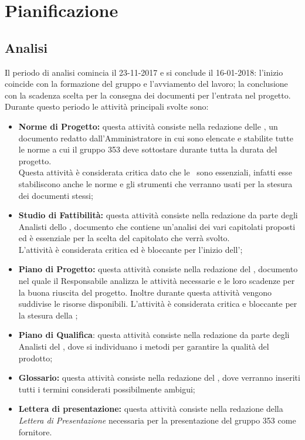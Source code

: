 \documentclass[PianoDiProgetto.tex]{subfiles}
\begin{document}
\chapter{Pianificazione}

\section{Analisi}
Il periodo di analisi comincia il 23-11-2017 e si conclude il 16-01-2018: l'inizio coincide con la formazione del gruppo e l'avviamento del lavoro; la conclusione con la scadenza scelta per la consegna dei documenti per l'entrata nel progetto. Durante questo periodo le attività principali svolte sono:
\begin{itemize}
	\item \textbf{Norme di Progetto:} questa attività consiste nella redazione delle \normediprogetto, un documento redatto dall'Amministratore in cui sono elencate e stabilite tutte le norme a cui il gruppo 353 deve sottostare durante tutta la durata del progetto.\\ 
	Questa attività è considerata critica dato che le \normediprogetto\ sono essenziali, infatti esse stabiliscono anche le norme e gli strumenti che verranno usati per la stesura dei documenti stessi;
	\item \textbf{Studio di Fattibilità:} questa attività consiste nella redazione da parte degli Analisti dello \studiodifattibilita, documento che contiene un'analisi dei vari capitolati proposti ed è essenziale per la scelta del capitolato che verrà svolto. \\
	L'attività è considerata critica ed è bloccante per l'inizio dell'\analisideirequisiti;
	\item \textbf{Piano di Progetto:} questa attività consiste nella redazione del \pianodiprogetto, documento nel quale il Responsabile analizza le attività necessarie e le loro scadenze per la buona riuscita del progetto. Inoltre durante questa attività vengono suddivise le risorse disponibili. L'attività è considerata critica e bloccante per la stesura della ;
	\item \textbf{Piano di Qualifica}: questa attività consiste nella redazione da parte degli Analisti del \pianodiqualifica, dove si individuano i metodi per garantire la qualità del prodotto;
	\item \textbf{Glossario:} questa attività consiste nella redazione del \glossario, dove verranno inseriti tutti i termini considerati possibilmente ambigui;
	\item \textbf{Lettera di presentazione:} questa attività consiste nella redazione della \textit{Lettera di Presentazione} necessaria per la presentazione del gruppo 353 come fornitore. 	
\end{itemize}	
\end{document}
